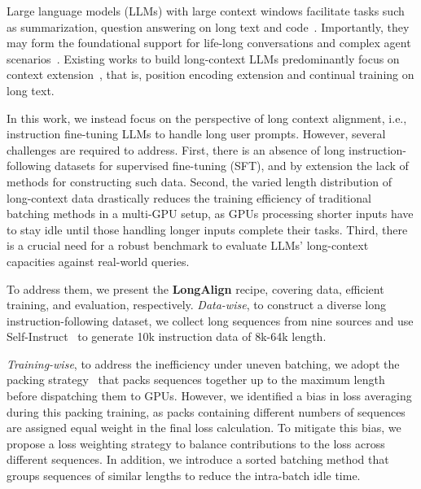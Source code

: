 Large language models (LLMs) with large context windows facilitate tasks such as summarization, question answering on long text and code~\cite{bai2023longbench}. 
Importantly, they may form the foundational support for life-long conversations and complex agent scenarios~\cite{xiao2023efficient,liu2023agentbench}. 
Existing works to build long-context LLMs predominantly focus on context extension~\cite{chen2023extending,xiong2023effective,peng2023yarn}, that is, position encoding extension and continual training on long text. 

In this work, we instead focus on the perspective of long context alignment, i.e., instruction fine-tuning LLMs to handle long user prompts. 
However, several challenges are required to address. 
First, there is an absence of long instruction-following datasets for supervised fine-tuning (SFT), and by extension the lack of methods for constructing such data. 
Second, the varied length distribution of long-context data drastically reduces the training efficiency of traditional batching methods in a multi-GPU setup, as GPUs processing shorter inputs have to stay idle until those handling longer inputs complete their tasks. 
Third, there is a crucial need for a robust benchmark to evaluate LLMs' long-context capacities against real-world queries.


To address them, we present the \textbf{LongAlign} recipe, covering data, efficient training, and evaluation, respectively. 
\textit{Data-wise}, to construct a diverse long instruction-following dataset, we collect long sequences from nine sources and use Self-Instruct~\cite{selfinstruct} to generate 10k instruction data of 8k-64k length. 

\textit{Training-wise}, to address the inefficiency under uneven batching, we adopt the packing strategy~\cite{krell2021efficient} that packs sequences together up to the maximum length before dispatching them to GPUs. 
However, we identified a bias in loss averaging during this packing training, as packs containing different numbers of sequences are assigned equal weight in the final loss calculation. 
To mitigate this bias, we propose a loss weighting strategy to balance contributions to the loss across different sequences.
In addition, we introduce a sorted batching method that groups sequences of similar lengths to reduce the intra-batch idle time.

